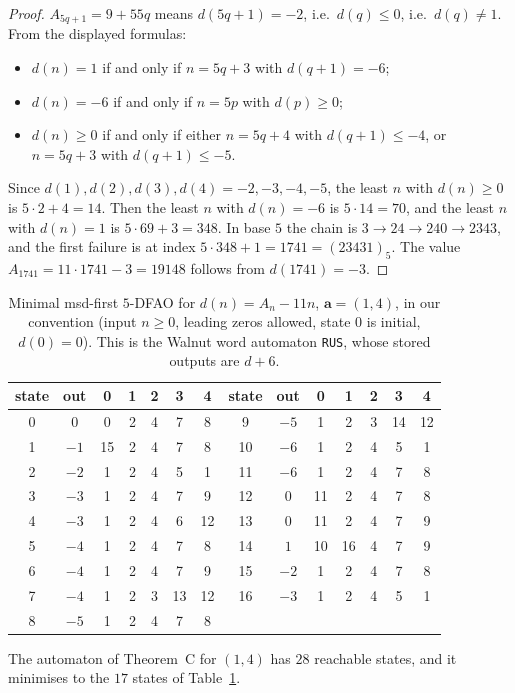 \documentclass[11pt]{amsart}
\theoremstyle{definition}
\theoremstyle{remark}
\begin{document}
\begin{proof}
$A_{5q+1}=9+55q$ means $d(5q+1)=-2$, i.e.\ $d(q)\le0$, i.e.\ $d(q)\neq1$. From the displayed formulas:
\begin{itemize}
\item $d(n)=1$ if and only if $n=5q+3$ with $d(q+1)=-6$;
\item $d(n)=-6$ if and only if $n=5p$ with $d(p)\ge0$;
\item $d(n)\ge0$ if and only if either $n=5q+4$ with $d(q+1)\le-4$, or $n=5q+3$ with $d(q+1)\le-5$.
\end{itemize}
Since $d(1),d(2),d(3),d(4)=-2,-3,-4,-5$, the least $n$ with $d(n)\ge0$ is $5\cdot2+4=14$. Then the least $n$ with $d(n)=-6$ is $5\cdot14=70$, and the least $n$ with $d(n)=1$ is $5\cdot69+3=348$. In base $5$ the chain is $3\to24\to240\to2343$, and the first failure is at index $5\cdot348+1=1741=(23431)_5$. The value $A_{1741}=11\cdot1741-3=19148$ follows from $d(1741)=-3$.
\end{proof}

\begin{table}[ht]
\centering
\caption{Minimal msd-first $5$-DFAO for $d(n)=A_n-11n$, $\mathbf a=(1,4)$, in our convention (input $n\ge0$, leading zeros allowed, state $0$ is initial, $d(0)=0$). This is the Walnut word automaton \texttt{RUS}, whose stored outputs are $d+6$.}\label{tab:RUS}
\begin{tabular}{c c c c c c c @{\qquad} c c c c c c c}
\toprule
state & out & 0&1&2&3&4 & state & out & 0&1&2&3&4\\
\midrule
0 & $0$ & 0&2&4&7&8 & 9 & $-5$ & 1&2&3&14&12\\
1 & $-1$ & 15&2&4&7&8 & 10 & $-6$ & 1&2&4&5&1\\
2 & $-2$ & 1&2&4&5&1 & 11 & $-6$ & 1&2&4&7&8\\
3 & $-3$ & 1&2&4&7&9 & 12 & $0$ & 11&2&4&7&8\\
4 & $-3$ & 1&2&4&6&12 & 13 & $0$ & 11&2&4&7&9\\
5 & $-4$ & 1&2&4&7&8 & 14 & $1$ & 10&16&4&7&9\\
6 & $-4$ & 1&2&4&7&9 & 15 & $-2$ & 1&2&4&7&8\\
7 & $-4$ & 1&2&3&13&12 & 16 & $-3$ & 1&2&4&5&1\\
8 & $-5$ & 1&2&4&7&8 & & & & & & & \\
\bottomrule
\end{tabular}
\end{table}

The automaton of Theorem~C for $(1,4)$ has $28$ reachable states, and it minimises to the $17$ states of Table~\ref{tab:RUS}.
\end{document}
